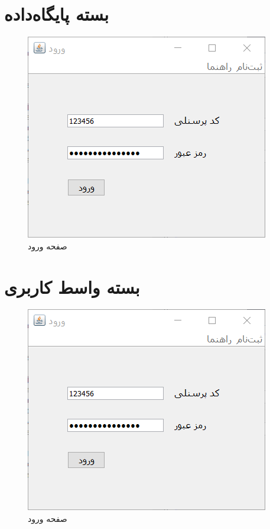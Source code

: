 \section{بسته پایگاه‌داده}
\begin{figure}[H]
	\centering
	\includegraphics[scale=0.8]{img/prot/LoginForm}
	\caption{صفحه ورود}
\end{figure}

\section{بسته واسط کاربری}
\begin{figure}[H]
	\centering
	\includegraphics[scale=0.8]{img/prot/LoginForm}
	\caption{صفحه ورود}
\end{figure}

